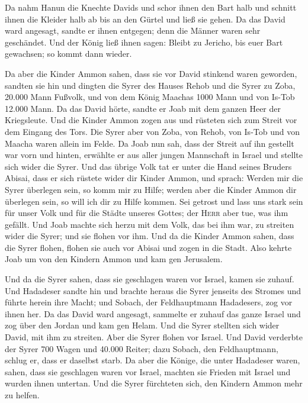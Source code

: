  Da nahm Hanun die Knechte Davids und schor ihnen den Bart
halb und schnitt ihnen die Kleider halb ab bis an den Gürtel und ließ
sie gehen.  Da das David ward angesagt, sandte er ihnen
entgegen; denn die Männer waren sehr geschändet. Und der König ließ
ihnen sagen: Bleibt zu Jericho, bis euer Bart gewachsen; so kommt dann
wieder.

 Da aber die Kinder Ammon sahen, dass sie vor David
stinkend waren geworden, sandten sie hin und dingten die Syrer des
Hauses Rehob und die Syrer zu Zoba, 20.000 Mann Fußvolk, und von dem
König Maachas 1000 Mann und von Is-Tob 12.000 Mann.  Da
das David hörte, sandte er Joab mit dem ganzen Heer der Kriegsleute.
 Und die Kinder Ammon zogen aus und rüsteten sich zum
Streit vor dem Eingang des Tors. Die Syrer aber von Zoba, von Rehob, von
Is-Tob und von Maacha waren allein im Felde.  Da Joab nun
sah, dass der Streit auf ihn gestellt war vorn und hinten, erwählte er
aus aller jungen Mannschaft in Israel und stellte sich wider die Syrer.
 Und das übrige Volk tat er unter die Hand seines Bruders
Abisai, dass er sich rüstete wider dir Kinder Ammon,  und
sprach: Werden mir die Syrer überlegen sein, so komm mir zu Hilfe;
werden aber die Kinder Ammon dir überlegen sein, so will ich dir zu
Hilfe kommen.  Sei getrost und lass uns stark sein für
unser Volk und für die Städte unseres Gottes; der \textsc{Herr} aber
tue, was ihm gefällt.  Und Joab machte sich herzu mit dem
Volk, das bei ihm war, zu streiten wider die Syrer; und sie flohen vor
ihm.  Und da die Kinder Ammon sahen, dass die Syrer
flohen, flohen sie auch vor Abisai und zogen in die Stadt. Also kehrte
Joab um von den Kindern Ammon und kam gen Jerusalem.

 Und da die Syrer sahen, dass sie geschlagen waren vor
Israel, kamen sie zuhauf.  Und Hadadeser sandte hin und
brachte heraus die Syrer jenseits des Stromes und führte herein ihre
Macht; und Sobach, der Feldhauptmann Hadadesers, zog vor ihnen her.
 Da das David ward angesagt, sammelte er zuhauf das ganze
Israel und zog über den Jordan und kam gen Helam. Und die Syrer stellten
sich wider David, mit ihm zu streiten.  Aber die Syrer
flohen vor Israel. Und David verderbte der Syrer 700 Wagen und 40.000
Reiter; dazu Sobach, den Feldhauptmann, schlug er, dass er daselbst
starb.  Da aber die Könige, die unter Hadadeser waren,
sahen, dass sie geschlagen waren vor Israel, machten sie Frieden mit
Israel und wurden ihnen untertan. Und die Syrer fürchteten sich, den
Kindern Ammon mehr zu helfen.

